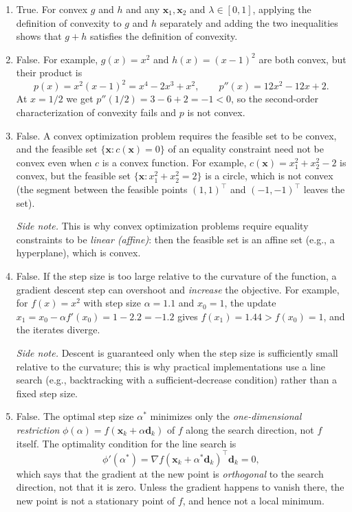 \begin{solution}
\begin{enumerate}[label=(\alph*)]
        \emph{Side note.} The argument never uses that there are only two sets, so an intersection of \emph{any} number of convex sets is convex. This is the reason the feasible set of a convex optimization problem is convex: it is the intersection of the sets defined by the individual constraints, one per constraint.
        \item  True. For convex $g$ and $h$ and any $\mathbf{x}_1, \mathbf{x}_2$ and $\lambda \in [0,1]$, applying the definition of convexity to $g$ and $h$ separately and adding the two inequalities shows that $g + h$ satisfies the definition of convexity.
        \item  False. For example, $g(x) = x^2$ and $h(x) = (x-1)^2$ are both convex, but their product is
        \[
            p(x) = x^2 (x-1)^2 = x^4 - 2x^3 + x^2,
            \qquad
            p''(x) = 12x^2 - 12x + 2.
        \]
        At $x = 1/2$ we get $p''(1/2) = 3 - 6 + 2 = -1 < 0$, so the second-order characterization of convexity fails and $p$ is not convex.
        \item  False. A convex optimization problem requires the feasible set to be convex, and the feasible set $\{\mathbf{x} : c(\mathbf{x}) = 0\}$ of an equality constraint need not be convex even when $c$ is a convex function. For example, $c(\mathbf{x}) = x_1^2 + x_2^2 - 2$ is convex, but the feasible set $\{\mathbf{x} : x_1^2 + x_2^2 = 2\}$ is a circle, which is not convex (the segment between the feasible points $(1,1)^\top$ and $(-1,-1)^\top$ leaves the set).

        \emph{Side note.} This is why convex optimization problems require equality constraints to be \emph{linear (affine)}: then the feasible set is an affine set (e.g., a hyperplane), which is convex.
        \item  False. If the step size is too large relative to the curvature of the function, a gradient descent step can overshoot and \emph{increase} the objective. For example, for $f(x) = x^2$ with step size $\alpha = 1.1$ and $x_0 = 1$, the update $x_1 = x_0 - \alpha f'(x_0) = 1 - 2.2 = -1.2$ gives $f(x_1) = 1.44 > f(x_0) = 1$, and the iterates diverge.

        \emph{Side note.} Descent is guaranteed only when the step size is sufficiently small relative to the curvature; this is why practical implementations use a line search (e.g., backtracking with a sufficient-decrease condition) rather than a fixed step size.
        \item  False. The optimal step size $\alpha^*$ minimizes only the \emph{one-dimensional restriction} $\phi(\alpha) = f(\mathbf{x}_k + \alpha \mathbf{d}_k)$ of $f$ along the search direction, not $f$ itself. The optimality condition for the line search is
        \[
            \phi'(\alpha^*) = \nabla f(\mathbf{x}_k + \alpha^* \mathbf{d}_k)^\top \mathbf{d}_k = 0,
        \]
        which says that the gradient at the new point is \emph{orthogonal} to the search direction, not that it is zero. Unless the gradient happens to vanish there, the new point is not a stationary point of $f$, and hence not a local minimum.


\end{enumerate}
\end{solution}

